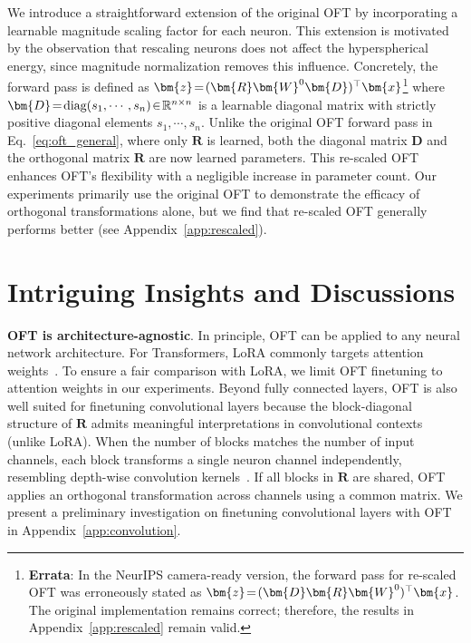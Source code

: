 We introduce a straightforward extension of the original OFT by incorporating a learnable magnitude scaling factor for each neuron. This extension is motivated by the observation that rescaling neurons does not affect the hyperspherical energy, since magnitude normalization removes this influence. Concretely, the forward pass is defined as $\thickmuskip=2mu \medmuskip=2mu\bm{z}=(\bm{R}\bm{W}^0\bm{D})^\top\bm{x}$\footnote{\textbf{Errata}: In the NeurIPS camera-ready version, the forward pass for re-scaled OFT was erroneously stated as $\thickmuskip=2mu \medmuskip=2mu\bm{z}=(\bm{D}\bm{R}\bm{W}^0)^\top\bm{x}$. The original implementation remains correct; therefore, the results in Appendix~\ref{app:rescaled} remain valid.} where $\thickmuskip=2mu \medmuskip=2mu \bm{D}=\text{diag}(s_1,\cdots,s_n)\in\mathbb{R}^{n\times n}$ is a learnable diagonal matrix with strictly positive diagonal elements $s_1,\cdots,s_n$. Unlike the original OFT forward pass in Eq.~\eqref{eq:oft_general}, where only $\bm{R}$ is learned, both the diagonal matrix $\bm{D}$ and the orthogonal matrix $\bm{R}$ are now learned parameters. This re-scaled OFT enhances OFT's flexibility with a negligible increase in parameter count. Our experiments primarily use the original OFT to demonstrate the efficacy of orthogonal transformations alone, but we find that re-scaled OFT generally performs better (see Appendix~\ref{app:rescaled}).

\section{Intriguing Insights and Discussions}

\textbf{OFT is architecture-agnostic}. In principle, OFT can be applied to any neural network architecture. For Transformers, LoRA commonly targets attention weights~\cite{hulora2022}. To ensure a fair comparison with LoRA, we limit OFT finetuning to attention weights in our experiments. Beyond fully connected layers, OFT is also well suited for finetuning convolutional layers because the block-diagonal structure of $\bm{R}$ admits meaningful interpretations in convolutional contexts (unlike LoRA). When the number of blocks matches the number of input channels, each block transforms a single neuron channel independently, resembling depth-wise convolution kernels~\cite{chollet2017xception}. If all blocks in $\bm{R}$ are shared, OFT applies an orthogonal transformation across channels using a common matrix. We present a preliminary investigation on finetuning convolutional layers with OFT in Appendix~\ref{app:convolution}.

